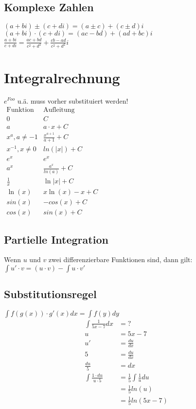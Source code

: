 \documentclass[a4paper, 10pt, landscape]{article}
\begin{document}
\begin{multicols}{5}
\begin{small}
        \subsection{Komplexe Zahlen}
	        $(a + bi) \pm (c + di) = (a \pm c) + (c \pm d)i$\\
	        $(a + bi) \cdot (c + di) = (ac - bd) + (ad + bc)i$\\
	        
            $\displaystyle \frac{a + bi}{c + di} = \frac{ac + bd}{c^2 + d^2} + \frac{cb - ad}{c^2 + d^2}i$
	\section{Integralrechnung}
	    $e^{Foo}$ u.ä. muss vorher substituiert werden!\\
        $\begin{matrix}
        \text{Funktion} & \text{Aufleitung} \\
        0 & C \\
        a & a \cdot x+C \\
        x^a, a \neq -1 & \frac{x^{a+1}}{a+1}+C\\
        x^{-1}, x \neq 0 & ln(|x|)+C\\
        e^x & e^x \\
        a^x & \frac{a^x}{ln(a)}+C \\
        \frac{1}{x} & \ln|x|+C\\
        \ln(x) & x \ln(x)-x+C\\
        sin(x) & -cos(x)+C\\
        cos(x) & sin(x)+C 
        \end{matrix}
        $
        \subsection{Partielle Integration}
	        Wenn $u$ und $v$ zwei differenzierbare Funktionen sind, dann gilt: \\
	        $\int u' \cdot v = (u \cdot v) - \int u \cdot v'$
        \subsection{Substitutionsregel}
	        $\int f(g(x)) \cdot g'(x) dx = \int f(y) dy$
	        \begin{align*}
	            \int \frac{1}{5x - 7} dx &= ?\\
	            u &= 5x-7\\
	            u' &= \frac{du}{dx} \\
	            5 &= \frac{du}{dx} \\   
	            \frac{du}{5} &= dx  \\
	            \int \frac{1 \cdot du}{u \cdot 5} &= \frac{1}{5} \int \frac{1}{u} du \\
                &= \frac{1}{5} ln(u) \\
                &= \frac{1}{5} ln(5x-7)
	        \end{align*}

\end{small}
\end{multicols}
\end{document}
